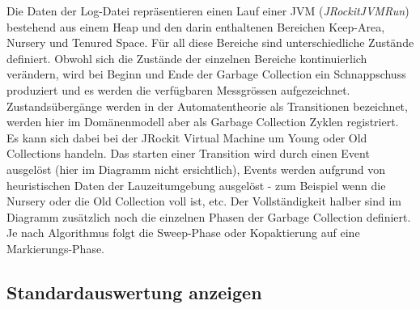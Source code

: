 Die Daten der Log-Datei repräsentieren einen Lauf einer JVM (\textit{JRockitJVMRun}) bestehend aus einem Heap und den darin enthaltenen Bereichen Keep-Area, Nursery und Tenured Space. Für all diese Bereiche sind unterschiedliche Zustände definiert. Obwohl sich die Zustände der einzelnen Bereiche kontinuierlich verändern, wird bei Beginn und Ende der Garbage Collection ein Schnappschuss produziert und es werden die verfügbaren Messgrössen aufgezeichnet. Zustandsübergänge werden in der Automatentheorie als Transitionen bezeichnet, werden hier im Domänenmodell aber als Garbage Collection Zyklen 
registriert. Es kann sich dabei bei der JRockit Virtual Machine um Young oder Old Collections handeln. Das starten einer Transition wird durch einen Event ausgelöst (hier im Diagramm nicht ersichtlich), Events werden aufgrund von heuristischen Daten der Lauzeitumgebung ausgelöst - zum Beispiel wenn die Nursery oder die Old Collection voll ist, etc. Der Vollständigkeit halber sind im Diagramm zusätzlich noch die einzelnen Phasen der Garbage Collection definiert. Je nach Algorithmus folgt die Sweep-Phase oder Kopaktierung auf eine Markierungs-Phase.


\subsection{Standardauswertung anzeigen}
